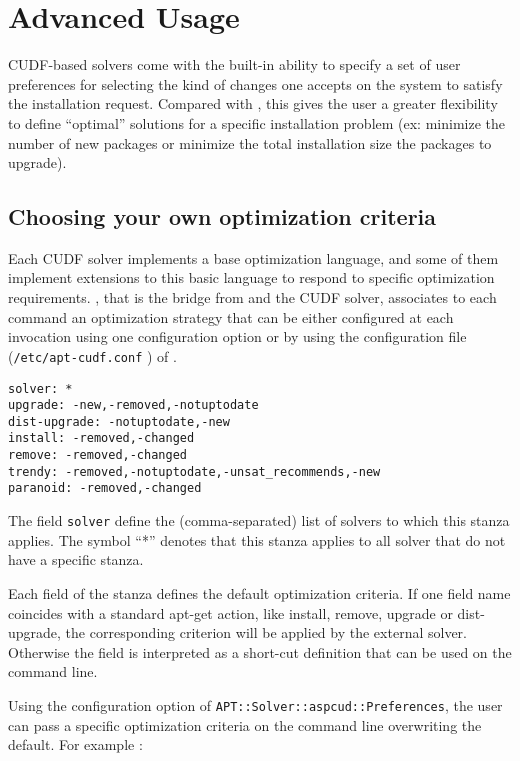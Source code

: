 \section{Advanced Usage}

CUDF-based solvers come with the built-in ability to specify a
set of user preferences for selecting the kind of changes one accepts
on the system to satisfy the installation request. Compared with
\aptget, this gives the user a greater flexibility to define
``optimal'' solutions for a specific installation problem (ex:
minimize the number of new packages or minimize the total installation
size the packages to upgrade).

\subsection{Choosing your own optimization criteria}

Each CUDF solver implements a base optimization language, and some of
them implement extensions to this basic language to respond to
specific optimization requirements. \aptcudf, that is the bridge from
\aptget and the CUDF solver, associates to each \aptget command an
optimization strategy that can be either configured at each invocation
using one \aptget configuration option or by using the configuration
file (\texttt{/etc/apt-cudf.conf} ) of \aptcudf.

\begin{verbatim}
solver: *
upgrade: -new,-removed,-notuptodate
dist-upgrade: -notuptodate,-new
install: -removed,-changed
remove: -removed,-changed
trendy: -removed,-notuptodate,-unsat_recommends,-new
paranoid: -removed,-changed
\end{verbatim}

The field \texttt{solver} define the (comma-separated) list of solvers
to which this stanza applies. The symbol ``*'' denotes that this
stanza applies to all solver that do not have a specific stanza.

Each field of the stanza defines the default optimization criteria.
If one field name coincides with a standard apt-get action, like
install, remove, upgrade or dist-upgrade, the corresponding criterion
will be applied by the external solver. Otherwise the field is
interpreted as a short-cut definition that can be used on the \aptget
command line.

Using the configuration option of \aptget
\texttt{APT::Solver::aspcud::Preferences}, the user can pass a
specific optimization criteria on the command line overwriting the
default. For example :


